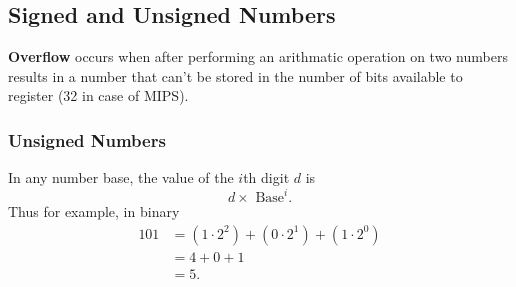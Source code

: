 \documentclass[10pt]{article}
\begin{document}
\subsection{Signed and Unsigned Numbers}\label{subsec:}
\begin{marginfigure}
\textbf{Overflow} occurs when after performing an arithmatic operation on two numbers results in a number that can't be stored in the number of bits available to register (32 in case of MIPS).
\end{marginfigure}%
\subsubsection{Unsigned Numbers}
In any number base, the value of the $i$th digit $d$ is
\[d \times \text{ Base}^i.\]
Thus for example, in binary
\begin{align*}
  101 &= (1\cdot 2^2) + (0 \cdot 2^1) + (1 \cdot 2^0)\\
      &= 4 + 0 + 1\\
      &= 5.
\end{align*}
\end{document}
